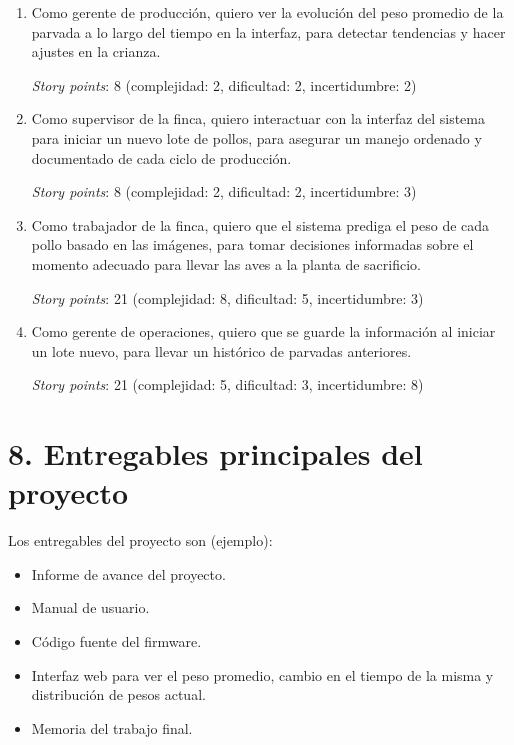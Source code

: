 \documentclass[
11pt, %
]{charter}
\begin{document}
\begin{enumerate}
\item Como gerente de producción, quiero ver la evolución del peso promedio de la parvada a lo largo del tiempo en la interfaz, para detectar tendencias y hacer ajustes en la crianza.

\textit{Story points}: 8 (complejidad: 2, dificultad: 2, incertidumbre: 2)

\item Como supervisor de la finca, quiero interactuar con la interfaz del sistema para iniciar un nuevo lote de pollos, para asegurar un manejo ordenado y documentado de cada ciclo de producción.

\textit{Story points}: 8 (complejidad: 2, dificultad: 2, incertidumbre: 3)

\item Como trabajador de la finca, quiero que el sistema prediga el peso de cada pollo basado en las imágenes, para tomar decisiones informadas sobre el momento adecuado para llevar las aves a la planta de sacrificio.

\textit{Story points}: 21 (complejidad: 8, dificultad: 5, incertidumbre: 3)

\item Como gerente de operaciones, quiero que se guarde la información al iniciar un lote nuevo, para llevar un histórico de parvadas anteriores.

\textit{Story points}: 21 (complejidad: 5, dificultad: 3, incertidumbre: 8)

\end{enumerate}

\section{8. Entregables principales del proyecto}
\label{sec:entregables}

Los entregables del proyecto son (ejemplo):

\begin{itemize}
	\item Informe de avance del proyecto.
	\item Manual de usuario.
	\item Código fuente del firmware.
	\item Interfaz web para ver el peso promedio, cambio en el tiempo de la misma y distribución de pesos actual.
	\item Memoria del trabajo final.
\end{itemize}
\end{document}
